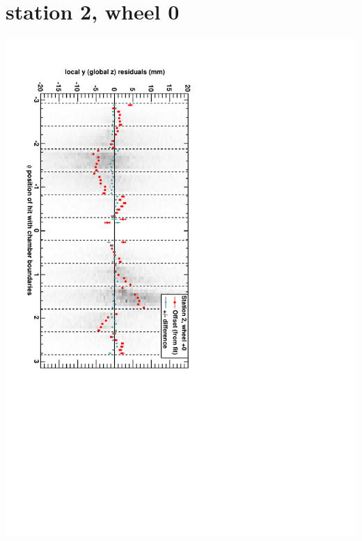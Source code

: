 \documentclass[compress]{beamer}
\begin{document}
\section*{station 2, wheel 0}
\begin{frame} \vfill \mbox{\hspace{-1 cm}\includegraphics[height=1.2\linewidth, angle=90]{DTzVsPhi_st2_whC.pdf}} \end{frame}
\end{document}
